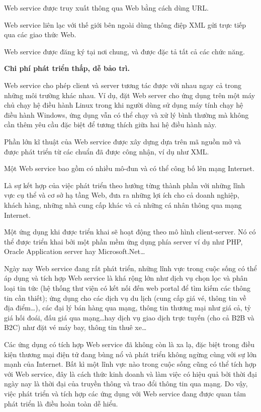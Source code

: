 Web service được truy xuất thông qua Web bằng cách dùng URL.

Web service liên lạc với thế giới bên ngoài dùng thông điệp XML gửi trực tiếp qua các giao thức Web.

Web service được đăng ký tại nơi chung, và được đặc tả tất cả các chức năng.

\textbf{Chi phí phát triển thấp, dễ bảo trì.}

Web service cho phép client và server tương tác được với nhau ngay cả trong những môi trường khác nhau. Ví dụ, đặt Web server cho ứng dụng trên một máy chủ chạy hệ điều hành Linux trong khi người dùng sử dụng máy tính chạy hệ điều hành Windows, ứng dụng vẫn có thể chạy và xử lý bình thường mà không cần thêm yêu cầu đặc biệt để tương thích giữa hai hệ điều hành này.

Phần lớn kĩ thuật của Web service được xây dựng dựa trên mã nguồn mở và được phát triển từ các chuẩn đã được công nhận, ví dụ như XML.

Một Web service bao gồm có nhiều mô-đun và có thể công bố lên mạng Internet.

Là sự kết hợp của việc phát triển theo hướng từng thành phần với những lĩnh vực cụ thể và cơ sở hạ tầng Web, đưa ra những lợi ích cho cả doanh nghiệp, khách hàng, những nhà cung cấp khác và cả những cá nhân thông qua mạng Internet.

Một ứng dụng khi được triển khai sẽ hoạt động theo mô hình client-server. Nó có thể được triển khai bởi một phần mềm ứng dụng phía server ví dụ như PHP, Oracle Application server hay Microsoft.Net…

Ngày nay Web service đang rất phát triển, những lĩnh vực trong cuộc sống có thể áp dụng và tích hợp Web service là khá rộng lớn như dịch vụ chọn lọc và phân loại tin tức (hệ thống thư viện có kết nối đến web portal để tìm kiếm các thông tin cần thiết); ứng dụng cho các dịch vụ du lịch (cung cấp giá vé, thông tin về địa điểm…), các đại lý bán hàng qua mạng, thông tin thương mại như giá cả, tỷ giá hối đoái, đấu giá qua mạng…hay dịch vụ giao dịch trực tuyến (cho cả B2B và B2C) như đặt vé máy bay, thông tin thuê xe…

Các ứng dụng có tích hợp Web service đã không còn là xa lạ, đặc biệt trong điều kiện thương mại điện tử đang bùng nổ và phát triển không ngừng cùng với sự lớn mạnh của Internet. Bất kì một lĩnh vực nào trong cuộc sống cũng có thể tích hợp với Web service, đây là cách thức kinh doanh và làm việc có hiệu quả bởi thời đại ngày nay là thời đại của truyền thông và trao đổi thông tin qua mạng. Do vậy, việc phát triển và tích hợp các ứng dụng với Web service đang được quan tâm phát triển là điều hoàn toàn dễ hiểu.

